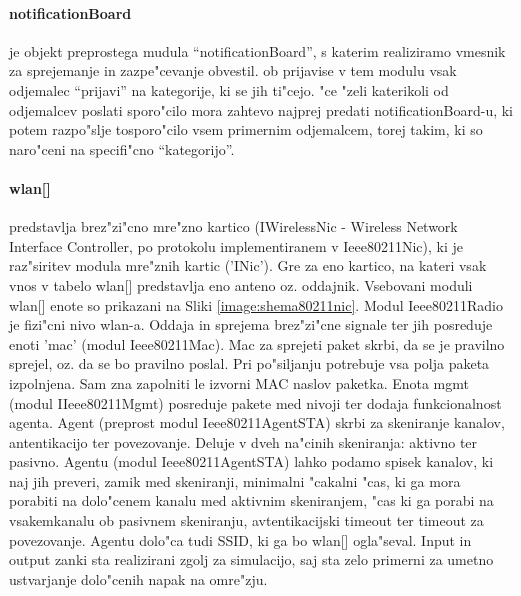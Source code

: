 \documentclass[a4paper,11pt]{article}
\begin{document}
\paragraph{notificationBoard}
\label{description:notificationboard}

je objekt preprostega mudula ``notificationBoard'', s katerim realiziramo vmesnik za sprejemanje in zazpe"cevanje obvestil. ob prijavise v tem modulu vsak odjemalec ``prijavi'' na kategorije, ki se jih ti"cejo. "ce "zeli katerikoli od odjemalcev poslati sporo"cilo mora zahtevo najprej predati notificationBoard-u, ki potem razpo"slje tosporo"cilo vsem primernim odjemalcem, torej takim, ki so naro"ceni na specifi"cno ``kategorijo''.

\paragraph{wlan[]}
\label{description:wlan}

predstavlja brez"zi"cno mre"zno kartico (IWirelessNic - Wireless Network Interface Controller, po protokolu implementiranem v Ieee80211Nic), ki je raz"siritev modula mre"znih kartic ('INic'). Gre za eno kartico, na kateri vsak vnos v tabelo wlan[] predstavlja eno anteno oz. oddajnik. Vsebovani moduli wlan[] enote so prikazani na Sliki \ref{image:shema80211nic}. Modul Ieee80211Radio je fizi"cni nivo wlan-a. Oddaja in sprejema brez"zi"cne signale ter jih posreduje enoti 'mac' (modul Ieee80211Mac). Mac za sprejeti paket skrbi, da se je pravilno sprejel, oz. da se bo pravilno poslal. Pri po"siljanju potrebuje vsa polja paketa izpolnjena. Sam zna zapolniti le izvorni MAC naslov paketka. Enota mgmt (modul IIeee80211Mgmt) posreduje pakete med nivoji ter dodaja funkcionalnost agenta. Agent (preprost modul Ieee80211AgentSTA) skrbi za skeniranje kanalov, antentikacijo ter povezovanje. Deluje v dveh na"cinih skeniranja: aktivno ter pasivno. Agentu (modul Ieee80211AgentSTA) lahko podamo spisek kanalov, ki naj jih preveri, zamik med skeniranji, minimalni "cakalni "cas, ki ga mora porabiti na dolo"cenem kanalu med aktivnim skeniranjem, "cas ki ga porabi na vsakemkanalu ob pasivnem skeniranju, avtentikacijski timeout ter timeout za povezovanje. Agentu dolo"ca tudi SSID, ki ga bo wlan[] ogla"seval. Input in output zanki sta realizirani zgolj za simulacijo, saj sta zelo primerni za umetno ustvarjanje dolo"cenih napak na omre"zju.
\end{document}
